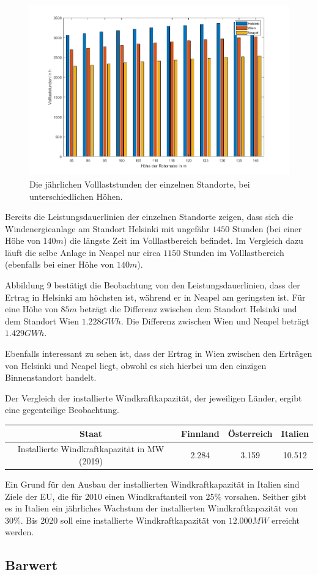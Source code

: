 \documentclass[a4paper,12pt]{article}
\begin{document}
	\begin{figure}[H]
		\centering
		\includegraphics[width=12cm]{img/results/VolllaststundenEuropa}
		\caption{Die jährlichen Volllaststunden der einzelnen Standorte, bei unterschiedlichen Höhen.}
	\end{figure}
	\noindent Bereits die Leistungsdauerlinien der einzelnen Standorte zeigen, dass sich die Windenergieanlage am Standort Helsinki mit ungefähr $1450$ Stunden (bei einer Höhe von $140m$) die längste Zeit im Volllastbereich befindet. Im Vergleich dazu läuft die selbe Anlage in Neapel nur circa $1150$ Stunden im Volllastbereich (ebenfalls bei einer Höhe von $140m$).\\ \par
	\noindent Abbildung 9 bestätigt die Beobachtung von den Leistungsdauerlinien, dass der Ertrag in Helsinki am höchsten ist, während er in Neapel am geringsten ist.\newline
	Für eine Höhe von $85m$ beträgt die Differenz zwischen dem Standort Helsinki und dem Standort Wien $1.228GWh$. Die Differenz zwischen Wien und Neapel beträgt $1.429GWh$.\\ \par
	\noindent Ebenfalls interessant zu sehen ist, dass der Ertrag in Wien zwischen den Erträgen von Helsinki und Neapel liegt, obwohl es sich hierbei um den einzigen Binnenstandort handelt.\\ \par
	\noindent Der Vergleich der installierte Windkraftkapazität, der jeweiligen Länder, ergibt eine gegenteilige Beobachtung.
	\begin{table}[H]
		\centering
		\begin{tabular}{|c|c|c|c|}
			\hline
			Staat                                        & Finnland & Österreich & Italien \\ \hline
			Installierte Windkraftkapazität in MW (2019) & 2.284    & 3.159      & 10.512  \\ \hline
		\end{tabular}
	\end{table}
	\noindent Ein Grund für den Ausbau der installierten Windkraftkapazität in Italien sind Ziele der EU, die für 2010 einen Windkraftanteil von $25\%$ vorsahen. Seither gibt es in Italien ein jährliches Wachstum der installierten Windkraftkapazität von $30\%$. Bis 2020 soll eine installierte Windkraftkapazität von $12.000MW$ erreicht werden.
	\subsection{Barwert}
	\newpage
	\listoffigures
	
\end{document}
